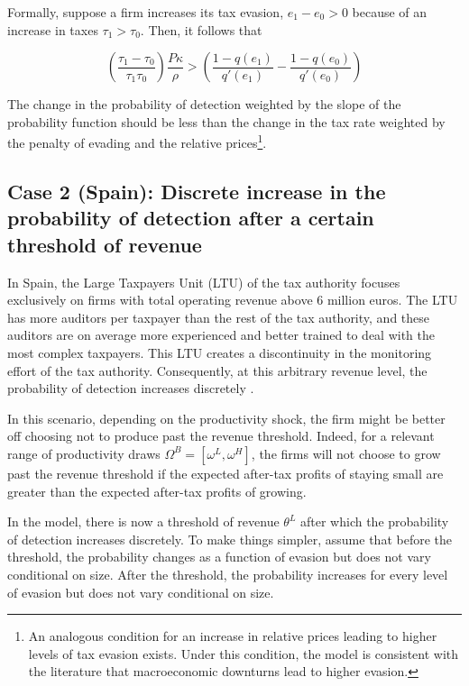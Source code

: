 \documentclass[
  12pt]{article}
\begin{document}
Formally, suppose a firm increases its tax evasion, \(e_1-e_0>0\)
because of an increase in taxes \(\tau_1>\tau_0\). Then, it follows that

\[
\left(\frac{\tau_1-\tau_0}{\tau_1\tau_0}\right)\frac{P\kappa}{\rho}>
  \left(\frac{1-q(e_1)}{q'(e_1)}-\frac{1-q(e_0)}{q'(e_0)}\right)
\]

The change in the probability of detection weighted by the slope of the
probability function should be less than the change in the tax rate
weighted by the penalty of evading and the relative prices\footnote{An
  analogous condition for an increase in relative prices leading to
  higher levels of tax evasion exists. Under this condition, the model
  is consistent with the literature that macroeconomic downturns lead to
  higher evasion.}.

\subsection{Case 2 (Spain): Discrete increase in the probability of
detection after a certain threshold of
revenue}\label{case-2-spain-discrete-increase-in-the-probability-of-detection-after-a-certain-threshold-of-revenue}

In Spain, the Large Taxpayers Unit (LTU) of the tax authority focuses
exclusively on firms with total operating revenue above 6 million euros.
The LTU has more auditors per taxpayer than the rest of the tax
authority, and these auditors are on average more experienced and better
trained to deal with the most complex taxpayers. This LTU creates a
discontinuity in the monitoring effort of the tax authority.
Consequently, at this arbitrary revenue level, the probability of
detection increases discretely \citep{Almunia2018}.

In this scenario, depending on the productivity shock, the firm might be
better off choosing not to produce past the revenue threshold. Indeed,
for a relevant range of productivity draws
\(\Omega^B=[\omega^L, \omega^H]\), the firms will not choose to grow
past the revenue threshold if the expected after-tax profits of staying
small are greater than the expected after-tax profits of growing.

In the model, there is now a threshold of revenue \(\theta^L\) after
which the probability of detection increases discretely. To make things
simpler, assume that before the threshold, the probability changes as a
function of evasion but does not vary conditional on size. After the
threshold, the probability increases for every level of evasion but does
not vary conditional on size.
\end{document}
